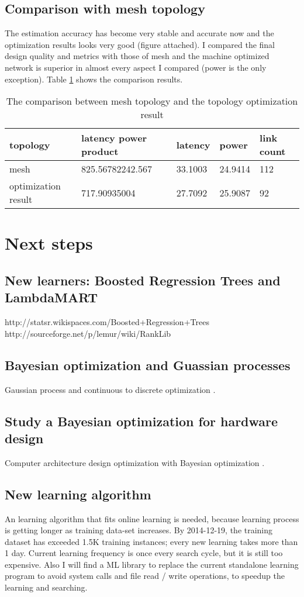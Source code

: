 \documentclass[12pt]{article}
\theoremstyle{definition}
\begin{document}
\subsection{Comparison with mesh topology}
The estimation accuracy has become very stable and accurate now and the optimization results looks very good (figure attached). I compared the final design quality and metrics with those of mesh and the machine optimized network is superior in almost every aspect I compared (power is the only exception). Table \ref{tab:record} shows the comparison results.
\begin{table}[htb]
  \centering
  \begin{tabularx}{\textwidth}{|X|l|l|l|l|} \hline
    topology & latency power product & latency & power & link count \\ \hline
    mesh & 825.56782242.567 & 33.1003 & 24.9414 & 112 \\ \hline
    optimization result & 717.90935004 & 27.7092 & 25.9087 & 92 \\ \hline
  \end{tabularx}
  \caption{The comparison between mesh topology and the topology optimization result}
  \label{tab:record}
\end{table}

\section{Next steps}
\subsection{New learners: Boosted Regression Trees and LambdaMART}
http://statsr.wikispaces.com/Boosted+Regression+Trees\\
http://sourceforge.net/p/lemur/wiki/RankLib
\subsection{Bayesian optimization and Guassian processes}
Gaussian process and continuous to discrete optimization \cite{brochu2010tutorial}.
\subsection{Study a Bayesian optimization for hardware design}
Computer architecture design optimization with Bayesian optimization \cite{demasiusing}.
\subsection{New learning algorithm}
An learning algorithm that fits online learning is needed, because learning process is getting longer as training data-set increases. By 2014-12-19, the training dataset has exceeded 1.5K training instances; every new learning takes more than 1 day. Current learning frequency is once every search cycle, but it is still too expensive. Also I will find a ML library to replace the current standalone learning program to avoid system calls and file read / write operations, to speedup the learning and searching.
\end{document}
